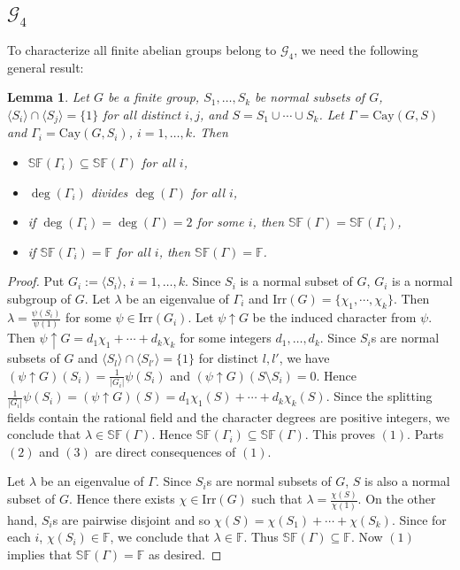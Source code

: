 \documentclass[12pt,a4paper]{article}
\newtheorem{lem}[thm]{Lemma}
\begin{document}
	\subsection{$\mathcal{G}_4$}
	To characterize all finite abelian groups belong to $\mathcal{G}_4$, we need the following general result:
	\begin{lem}\label{induced}
		Let $G$ be a finite group, $S_1,\ldots,S_k$ be normal subsets of $G$, $\langle S_i\rangle\cap\langle S_j\rangle=\{1\}$ for all distinct $i,j$, and $S=S_1\cup\cdots\cup S_k$. Let $\Gamma=\mathrm{Cay}(G,S)$ and  $\Gamma_i=\mathrm{Cay}(G,S_i)$, $i=1,\ldots,k$. Then
		\begin{itemize}
			\item[$(1)$] $\mathbb{SF}(\Gamma_i)\subseteq\mathbb{SF}(\Gamma)$ for all $i$,
			\item[$(2)$] $\deg(\Gamma_i)$ divides $\deg(\Gamma)$ for all $i$,
			\item[$(3)$] if $\deg(\Gamma_i)=\deg(\Gamma)=2$ for some $i$, then $\mathbb{SF}(\Gamma)=\mathbb{SF}(\Gamma_i)$,
			\item[$(4)$] if $\mathbb{SF}(\Gamma_i)=\mathbb{F}$ for all $i$, then $\mathbb{SF}(\Gamma)=\mathbb{F}$.
		\end{itemize}
	\end{lem}
	\begin{proof}
		Put $G_i:=\langle S_i\rangle$, $i=1,\ldots,k$. Since $S_i$ is a normal subset of $G$, $G_i$ is a normal subgroup of $G$. Let $\lambda$ be an eigenvalue
		of $\Gamma_i$ and $\mathrm{Irr}(G)=\{\chi_1,\cdots,\chi_k\}$. Then $\lambda=\frac{\psi(S_i)}{\psi(1)}$ for some $\psi\in\mathrm{Irr}(G_i)$. Let $\psi\uparrow G$ be the induced character from $\psi$. Then $\psi\uparrow G=d_1\chi_1+\cdots+d_k\chi_k$ for some integers $d_1,\ldots,d_k$. Since $S_i$s are normal subsets of $G$ and $\langle S_l\rangle\cap\langle S_{l'}\rangle=\{1\}$ for distinct $l,l'$, we have $(\psi\uparrow G)(S_i)=\frac{1}{|G_i|}\psi(S_i)$ and $(\psi\uparrow G)(S\setminus S_i)=0$. Hence $\frac{1}{|G_i|}\psi(S_i)=(\psi\uparrow G)(S)=d_1\chi_1(S)+\cdots+d_k\chi_k(S)$. Since the splitting fields contain the rational field and the character degrees are positive integers, we conclude that $\lambda\in\mathbb{SF}(\Gamma)$. Hence $\mathbb{SF}(\Gamma_i)\subseteq\mathbb{SF}(\Gamma)$. This proves $(1)$. Parts $(2)$ and $(3)$ are direct consequences of $(1)$.
		
		Let $\lambda$ be an eigenvalue of $\Gamma$. Since $S_i$s are normal subsets of $G$, $S$ is also a normal subset of $G$. Hence there exists $\chi\in\mathrm{Irr}(G)$ such that
		$\lambda=\frac{\chi(S)}{\chi(1)}$. On the other hand, $S_i$s are pairwise disjoint and so $\chi(S)=\chi(S_1)+\cdots+\chi(S_k)$. Since for each $i$, $\chi(S_i)\in\mathbb{F}$, we conclude
		that $\lambda\in\mathbb{F}$. Thus $\mathbb{SF}(\Gamma)\subseteq\mathbb{F}$. Now $(1)$ implies that $\mathbb{SF}(\Gamma)=\mathbb{F}$ as desired.
	\end{proof}
\end{document}
